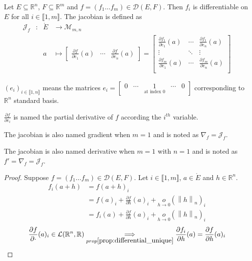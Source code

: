 \documentclass[11pt,en]{elegantpaper}
\newcommand{\norm}[1]{\left\lVert#1\right\rVert}
\newcommand{\Real}{\mathbb{R}}
\begin{document}
\begin{definition}
  Let $E \subseteq \Real^n$, $F \subseteq \Real^m$ and $f = (f_1 \ldots f_m) \in \mathcal{D}(E,F)$.
  Then $f_i$ is differentiable on $E$ for all $i \in \llbracket 1,m \rrbracket$. The jacobian is defined as \begin{equation}
    \begin{array}{llll}
      \mathcal{J}_f & : & \mathring{E} & \longrightarrow \mathcal{M}_{m,n} \\
        &   & a & \longmapsto \begin{bmatrix}
        \frac{\partial f}{\partial e_1}(a) & \cdots & \frac{\partial f}{\partial e_n}(a)
      \end{bmatrix} = \begin{bmatrix}
        \frac{\partial f_1}{\partial e_1}(a) & \cdots & \frac{\partial f_1}{\partial e_n}(a) \\
        \vdots & \ddots & \vdots \\
        \frac{\partial f_m}{\partial e_1}(a) & \cdots & \frac{\partial f_m}{\partial e_n}(a) \\
      \end{bmatrix}
    \end{array}
  \end{equation}

  $(e_i)_{i \in \llbracket 1,n \rrbracket}$ means the matrices $e_i = \begin{bmatrix}
    0 & \cdots & \underset{\text{at index 0}} 1 & \cdots & 0
  \end{bmatrix}$ corresponding to $\Real^n$ standard basis. \par
  $\frac{\partial f}{\partial e_i}$ is named the partial derivative of $f$ according the $i^{th}$ variable. \par
  The jacobian is also named gradient when $m=1$ and is noted as $\nabla_f = \mathcal{J}_f$. \par
  The jacobian is also named derivative when $m=1$ with $n=1$ and is noted as $f' = \nabla_f = \mathcal{J}_f$.
\end{definition}

\begin{proof}
  Suppose $f = (f_1 \ldots f_m) \in \mathcal{D}(E,F)$. Let $i \in \llbracket 1,m \rrbracket$, $a \in \mathring{E}$ and $h \in \Real^n$.
  \begin{equation*}
    \begin{split}
      f_i (a + h) & = f(a + h)_i \\
      & = f(a)_i + \frac{\partial f}{\partial h}(a)_i + \underset{h \to 0}o(\norm h _n)_i \\
      & = f_i(a) + \frac{\partial f}{\partial h}(a)_i + \underset{h \to 0}o(\norm h _n)_i
    \end{split}
  \end{equation*}
  \begin{equation*}
    \frac{\partial f}{\partial \cdot}(a)_i \in \mathcal{L}(\Real^n,\Real) \underset{prop\ref{prop:differential_unique}}\implies \frac{\partial f_i}{\partial h}(a) = \frac{\partial f}{\partial h}(a)_i
  \end{equation*}
\end{proof}
\end{document}
